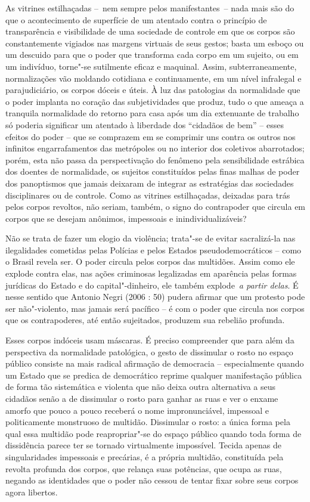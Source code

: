 As vitrines estilhaçadas --~nem sempre pelos manifestantes~-- nada mais
são do que o acontecimento de superfície de um atentado contra o
princípio de transparência e visibilidade de uma sociedade de controle
em que os corpos são constantemente vigiados nas margens virtuais de
seus gestos; basta um esboço ou um descuido para que o poder que
transforma cada corpo em um sujeito, ou em um indivíduo, torne"-se
sutilmente eficaz e maquinal. Assim, subterraneamente, normalizações vão
moldando cotidiana e continuamente, em um nível infralegal e
parajudiciário, os corpos dóceis e úteis. À luz das patologias da
normalidade que o poder implanta no coração das subjetividades que
produz, tudo o que ameaça a tranquila normalidade do retorno para casa
após um dia extenuante de trabalho só poderia significar um atentado à
liberdade dos ``cidadãos de bem'' -- esses efeitos do poder -- que se
comprazem em se comprimir uns contra os outros nos infinitos
engarrafamentos das metrópoles ou no interior dos coletivos abarrotados;
porém, esta não passa da perspectivação do fenômeno pela sensibilidade
estrábica dos doentes de normalidade, os sujeitos constituídos pelas
finas malhas de poder dos panoptismos que jamais deixaram de integrar as
estratégias das sociedades disciplinares ou de controle. Como as
vitrines estilhaçadas, deixadas para trás pelos corpos revoltos, não
seriam, também, o signo do contrapoder que circula em corpos que se
desejam anônimos, impessoais e inindividualizáveis?

Não se trata de fazer um elogio da violência; trata"-se de evitar
sacralizá-la nas ilegalidades cometidas pelas Polícias e pelos Estados
pseudodemocráticos -- como o Brasil revela ser. O poder circula pelos
corpos das multidões. Assim como ele explode contra elas, nas ações
criminosas legalizadas em aparência pelas formas jurídicas do Estado e
do capital"-dinheiro, ele também explode~\emph{a partir delas}. É nesse
sentido que Antonio Negri (2006 : 50) pudera afirmar que um protesto
pode ser não"-violento, mas jamais será pacífico -- é com o poder que
circula nos corpos que os contrapoderes, até então sujeitados, produzem
sua rebelião profunda.

Esses corpos indóceis usam máscaras. É preciso compreender que para além
da perspectiva da normalidade patológica, o gesto de dissimular o rosto
no espaço público consiste na mais radical afirmação de democracia --
especialmente quando um Estado que se predica de democrático reprime
qualquer manifestação pública de forma tão sistemática e violenta que
não deixa outra alternativa a seus cidadãos senão a de dissimular o
rosto para ganhar as ruas e ver o enxame amorfo que pouco a pouco
receberá o nome impronunciável, impessoal e politicamente monstruoso de
multidão. Dissimular o rosto: a única forma pela qual essa multidão pode
reapropriar"-se do espaço público quando toda forma de dissidência parece
ter se tornado virtualmente impossível. Tecida apenas de singularidades
impessoais e precárias, é a própria multidão, constituída pela revolta
profunda dos corpos, que relança suas potências, que ocupa as ruas,
negando as identidades que o poder não cessou de tentar fixar sobre seus
corpos agora libertos.

